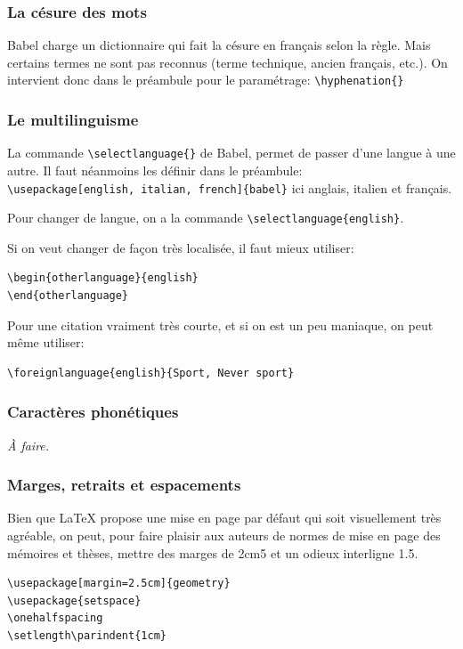 \documentclass[a4paper,twoside,french,12pt]{article}
\begin{document}
\subsubsection{La césure des mots}

Babel charge un dictionnaire qui fait la césure en français selon la règle. Mais certains termes ne sont pas reconnus (terme technique, ancien français, etc.).
On intervient donc dans le préambule pour le paramétrage: \verb=\hyphenation{}=



\subsubsection{Le multilinguisme}

La commande \verb=\selectlanguage{}= 
de Babel, permet de passer d'une langue à une autre. Il faut néanmoins les définir dans le préambule:\\
\verb=\usepackage[english, italian, french]{babel}= ici anglais, italien et français.

Pour changer de langue, on a la commande \verb=\selectlanguage{english}=.

Si on veut changer de façon très localisée, il faut mieux utiliser:
\begin{verbatim}
\begin{otherlanguage}{english}
\end{otherlanguage}
\end{verbatim}
Pour une citation vraiment très courte, et si on est un peu maniaque, on peut même utiliser:
\begin{verbatim}
\foreignlanguage{english}{Sport, Never sport}
\end{verbatim}

\subsubsection{Caractères phonétiques}
\textit{À faire.}

\subsubsection{Marges, retraits et espacements}
Bien que \LaTeX{} propose une mise en page par défaut qui soit visuellement très agréable, on peut, pour faire plaisir aux auteurs de normes de mise en page des mémoires et thèses, mettre des marges de 2cm5 et un odieux interligne 1.5.
\begin{verbatim}
\usepackage[margin=2.5cm]{geometry}
\usepackage{setspace}
\onehalfspacing
\setlength\parindent{1cm}
\end{verbatim}
\end{document}
